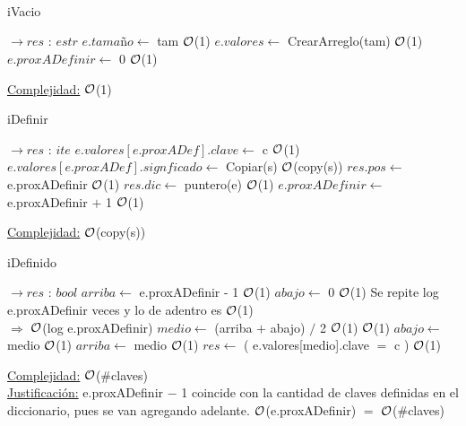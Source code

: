 \begin{Representacion}
~

	
~

		
~

	\begin{algorithm}[H]
		\caption{iVacio}
		\begin{algorithmic}
			 $\to res$ : $estr$
				\State $e.tamaño \gets$ tam \Comment $\mathcal{O}$(1)
				\State $e.valores \gets$ CrearArreglo(tam) \Comment $\mathcal{O}$(1)
				\State $e.proxADefinir \gets$ 0 \Comment $\mathcal{O}$(1)				
			\EndProcedure
		\end{algorithmic}
		\underline{Complejidad:} $\mathcal{O}$(1)
	\end{algorithm}
	
	\begin{algorithm}[H]
		\caption{iDefinir}
		\begin{algorithmic}
			 $\to res$ : $ite$
				\State $e.valores[e.proxADef].clave \gets$ c \Comment $\mathcal{O}$(1)
				\State $e.valores[e.proxADef].signficado \gets$ Copiar(s) \Comment $\mathcal{O}$(copy(s))
				\State $res.pos \gets$ e.proxADefinir \Comment $\mathcal{O}$(1)
				\State $res.dic \gets$ puntero(e) \Comment $\mathcal{O}$(1)
				\State $e.proxADefinir \gets$ e.proxADefinir $+$ 1 \Comment $\mathcal{O}$(1)
			\EndProcedure
		\end{algorithmic}
		\underline{Complejidad:} $\mathcal{O}$(copy(s))
	\end{algorithm}
	
	\begin{algorithm}[H]
		\caption{iDefinido}
		\begin{algorithmic}
			 $\to res$ : $bool$
				\State $arriba \gets$ e.proxADefinir - 1 \Comment $\mathcal{O}$(1)
				\State $abajo \gets$ 0 \Comment $\mathcal{O}$(1)
				 \Comment Se repite log e.proxADefinir veces y lo de adentro es $\mathcal{O}$(1)\\
				 \hfill $\Rightarrow$ $\mathcal{O}$(log e.proxADefinir)
					\State $	medio \gets$ (arriba $+$ abajo) $/$ 2 \Comment $\mathcal{O}$(1)
					 \Comment $\mathcal{O}$(1)
						\State $abajo \gets$ medio \Comment $\mathcal{O}$(1)
					\Else
						\State $arriba \gets$ medio \Comment $\mathcal{O}$(1)
					\EndIf
				\EndWhile
				\State $res \gets$ ( e.valores[medio].clave $=$ c ) \Comment $\mathcal{O}$(1)
			\EndProcedure
		\end{algorithmic}
		\underline{Complejidad:} $\mathcal{O}$($\#$claves)\\
		\underline{Justificación:} e.proxADefinir $-$ 1 coincide con la cantidad de claves definidas en el diccionario, pues se van agregando adelante. $\mathcal{O}$(e.proxADefinir) $=$ $\mathcal{O}$($\#$claves)
	\end{algorithm}
	

\end{Representacion}
